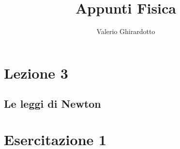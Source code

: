 \documentclass[a4paper]{book}
\begin{document}
\title{Appunti Fisica}
\author{Valerio Ghirardotto}
\maketitle
\tableofcontents



\chapter{Lezione 3}
\section{Le leggi di Newton}

\chapter{Esercitazione 1}
\end{document}
